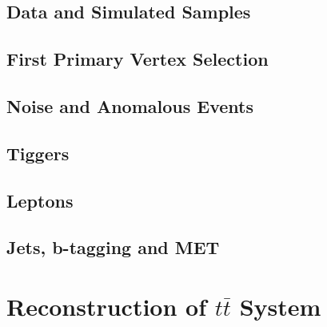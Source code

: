 \subsection{Data and Simulated Samples}
\subsection{First Primary Vertex Selection}
\subsection{Noise and Anomalous Events}
\subsection{Tiggers}
\subsection{Leptons}
\subsection{Jets, b-tagging and MET}
\section{Reconstruction of $t\bar{t}$ System}

	



\clearpage{\pagestyle{empty}\cleardoublepage}
